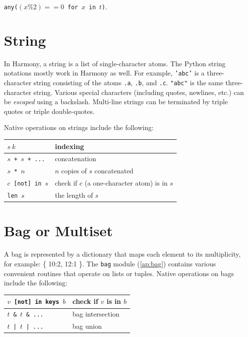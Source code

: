 \documentclass{report}
\begin{document}
\texttt{any($(x \% 2) == 0$ for $x$ in $t$)}.

\section{String}

In Harmony, a string is a list of single-character atoms.
The Python string notations mostly work in Harmony as well.
For example, \texttt{'abc'} is a three-character string
consisting of the atoms \texttt{.a}, \texttt{.b}, and
\texttt{.c}.
\texttt{"abc"} is the same three-character string.
Various special characters (including quotes, newlines, etc.)
can be \emph{escaped} using a backslash.
Multi-line strings can be terminated by triple quotes or
triple double-quotes.

Native operations on strings include the following:

\begin{center}
\begin{tabular}{|l|l|}
\hline
\texttt{$s~k$} & indexing \\
\hline
\texttt{$s$ + $s$ + ...} & concatenation \\
\hline
\texttt{$s$ * $n$} & $n$ copies of $s$ concatenated \\
\hline
\texttt{$c$ [not] in $s$} & check if $c$ (a one-character atom) is in $s$ \\
\hline
\texttt{len $s$} & the length of $s$ \\
\hline
\end{tabular}
\end{center}

\section{Bag or Multiset}

A bag is represented by a dictionary that maps each element to its
multiplicity, for example: \{ 10:2, 12:1 \}.
The \texttt{bag} module (\autoref{ap:bag}) contains various
convenient routines that operate on lists or tuples.
Native operations on bags include the following:

\begin{center}
\begin{tabular}{|l|l|}
\hline
\texttt{$v$ [not] in keys $b$} & check if $v$ is in $b$ \\
\hline
\texttt{$t$ \& $t$ \& ...} & bag intersection\\
\hline
\texttt{$t$ | $t$ | ...} & bag union \\
\hline
\end{tabular}
\end{center}
\end{document}
